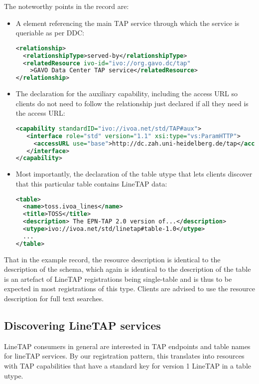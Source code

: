 \documentclass[11pt,a4paper]{ivoa}
\begin{document}
The noteworthy points in the record are:

\begin{itemize}
\item A  element referencing the main TAP service
through which the service is queriable as per DDC:
\begin{lstlisting}[language=XML,basicstyle=\footnotesize]
<relationship>
  <relationshipType>served-by</relationshipType>
  <relatedResource ivo-id="ivo://org.gavo.dc/tap"
    >GAVO Data Center TAP service</relatedResource>
</relationship>
\end{lstlisting}

\item The declaration for the auxiliary capability, including the access
URL so clients do not need to follow the relationship just declared if
all they need is the access URL:
\begin{lstlisting}[language=XML,basicstyle=\footnotesize]
<capability standardID="ivo://ivoa.net/std/TAP#aux">
   <interface role="std" version="1.1" xsi:type="vs:ParamHTTP">
     <accessURL use="base">http://dc.zah.uni-heidelberg.de/tap</accessURL>
   </interface>
</capability>
\end{lstlisting}

\item Most importantly, the declaration of the table utype that lets
clients discover that this particular table contains LineTAP data:
\begin{lstlisting}[language=XML,basicstyle=\footnotesize]
<table>
  <name>toss.ivoa_lines</name>
  <title>TOSS</title>
  <description> The EPN-TAP 2.0 version of...</description>
  <utype>ivo://ivoa.net/std/linetap#table-1.0</utype>
  ...
</table>
\end{lstlisting}
\end{itemize}

That in the example record, the resource description is identical to the
description of the schema, which again is identical to the description
of the table is an artefact of LineTAP registrations being single-table
and is thus to be expected in most registrations of this type.  Clients
are advised to use the resource description for full text searches.


\subsection{Discovering LineTAP services}

LineTAP consumers in general are interested in TAP endpoints and table names for
lineTAP services.  By our registration pattern, this translates into
resources with TAP capabilities that have a standard key for version 1
LineTAP in a table utype.
\end{document}
